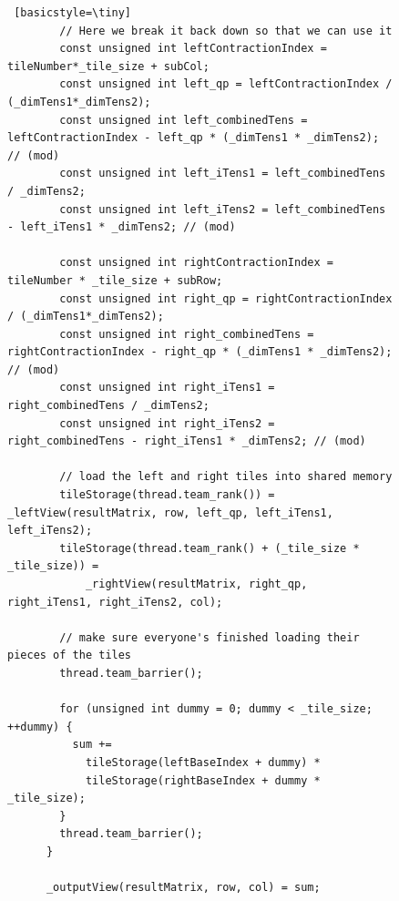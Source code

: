 \begin{figure}[H]
\begin{lstlisting} [basicstyle=\tiny]
        // Here we break it back down so that we can use it
        const unsigned int leftContractionIndex = tileNumber*_tile_size + subCol;
        const unsigned int left_qp = leftContractionIndex / (_dimTens1*_dimTens2);
        const unsigned int left_combinedTens = leftContractionIndex - left_qp * (_dimTens1 * _dimTens2); // (mod)
        const unsigned int left_iTens1 = left_combinedTens / _dimTens2;
        const unsigned int left_iTens2 = left_combinedTens - left_iTens1 * _dimTens2; // (mod)

        const unsigned int rightContractionIndex = tileNumber * _tile_size + subRow; 
        const unsigned int right_qp = rightContractionIndex / (_dimTens1*_dimTens2);
        const unsigned int right_combinedTens = rightContractionIndex - right_qp * (_dimTens1 * _dimTens2); // (mod)
        const unsigned int right_iTens1 = right_combinedTens / _dimTens2;
        const unsigned int right_iTens2 = right_combinedTens - right_iTens1 * _dimTens2; // (mod)

        // load the left and right tiles into shared memory
        tileStorage(thread.team_rank()) = _leftView(resultMatrix, row, left_qp, left_iTens1, left_iTens2);
        tileStorage(thread.team_rank() + (_tile_size * _tile_size)) =
            _rightView(resultMatrix, right_qp, right_iTens1, right_iTens2, col);

        // make sure everyone's finished loading their pieces of the tiles
        thread.team_barrier();

        for (unsigned int dummy = 0; dummy < _tile_size; ++dummy) {
          sum +=
            tileStorage(leftBaseIndex + dummy) *
            tileStorage(rightBaseIndex + dummy * _tile_size);
        }
        thread.team_barrier();
      }
      
      _outputView(resultMatrix, row, col) = sum;
      
 \end{lstlisting}

\label{lst:CFFTTiling}
\end{figure}
 
 
